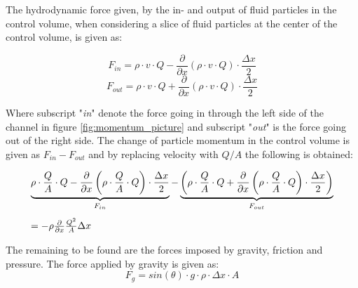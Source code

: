 The hydrodynamic force given, by the in- and output of fluid particles in the control volume, when considering a slice of fluid particles at the center of the control volume, is given as:

\begin{equation}
	F_{in}= \rho \cdot v \cdot Q - \frac{\partial}{\partial x}(\rho \cdot v \cdot Q) \cdot \frac{\Delta x}{2}
\end{equation}
\begin{equation}
	F_{out} = \rho \cdot v \cdot Q + \frac{\partial}{\partial x}(\rho \cdot v \cdot Q) \cdot \frac{\Delta x}{2}
\end{equation}

Where subscript "\textit{in}" denote the force going in through the left side of the channel in figure \ref{fig:momentum_picture} and subscript "\textit{out}" is the force going out of the right side. The change of particle momentum in the control volume is given as $F_{in}- F_{out}$ and by replacing velocity with $Q/A$ the following is obtained:

\begin{equation}\label{mass_flow_speed}
\begin{array}{l}
\underbrace{\rho \cdot \frac{Q}{A} \cdot Q - \frac{\partial}{\partial x}\left(\rho \cdot \frac{Q}{A}  \cdot Q\right) \cdot \frac{\Delta x}{2}}_{F_{in}} - %
\underbrace{\left(\rho \cdot \frac{Q}{A}  \cdot Q + \frac{\partial}{\partial x}\left(\rho \cdot \frac{Q}{A}  \cdot Q\right) \cdot \frac{\Delta x}{2} \right)}_{F_{out}} \vspace{3mm}\\ 
= -  \rho\frac{\partial}{\partial x} \frac{Q^2}{A}\Delta x
\end{array}
\end{equation}

The remaining to be found are the forces imposed by gravity, friction and pressure. The force applied by gravity is given as:
\begin{equation}
F_g = sin(\theta)\cdot g \cdot \rho \cdot \Delta x \cdot A
\label{gravity_force} 
\end{equation}

